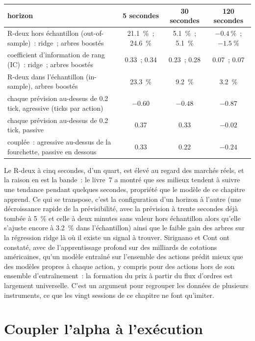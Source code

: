 \begin{center}
\small
\begin{tabular}{@{}p{6.6cm}ccc@{}}
\toprule
horizon & 5 secondes & 30 secondes & 120 secondes\\
\midrule
R-deux hors échantillon (out-of-sample)~: ridge~; arbres boostés & 21.1~\%~; 24.6~\% & 5.1~\%~; 5.1~\% & $-0.4~\%$~; $-1.5~\%$\\
coefficient d'information de rang (IC)~: ridge~; arbres boostés & 0.33~; 0.34 & 0.23~; 0.28 & 0.07~; 0.07\\
R-deux dans l'échantillon (in-sample), arbres boostés & 23.3~\% & 9.2~\% & 3.2~\%\\
\midrule
chaque prévision au-dessus de 0.2 tick, agressive (ticks par action) & $-0.60$ & $-0.48$ & $-0.87$\\
chaque prévision au-dessus de 0.2 tick, passive & 0.37 & 0.33 & $-0.02$\\
couplée~: agressive au-dessus de la fourchette, passive en dessous & 0.33 & 0.22 & $-0.24$\\
\bottomrule
\end{tabular}
\end{center}

Le R-deux à cinq secondes, d'un quart, est élevé au regard des marchés réels, et la raison en est la bande~: le livre~7 a montré que ses milieux tendent à suivre une tendance pendant quelques
secondes, propriété que le modèle de ce chapitre apprend. Ce qui se transpose, c'est la configuration d'un horizon à l'autre (une décroissance rapide de la prévisibilité, avec la prévision à trente secondes
déjà tombée à 5~\% et celle à deux minutes sans valeur hors échantillon alors qu'elle s'ajuste encore à 3.2~\% dans l'échantillon) ainsi que le faible gain des arbres sur la régression ridge
là où il existe un signal à trouver. Sirignano et Cont ont constaté, avec de l'apprentissage profond sur des milliards de cotations américaines, qu'un modèle entraîné sur l'ensemble des actions prédit mieux
que des modèles propres à chaque action, y compris pour des actions hors de son ensemble d'entraînement~: la formation du prix à partir du flux d'ordres est largement universelle. C'est un argument pour regrouper
les données de plusieurs instruments, ce que les vingt sessions de ce chapitre ne font qu'imiter.

\section{Coupler l'alpha à l'exécution}

